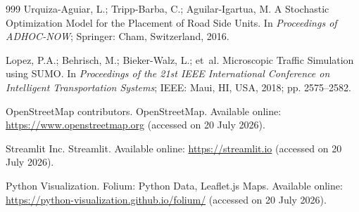 \documentclass[engproc,proceedingpaper,submit,oneauthor]{Definitions/mdpi}
\begin{document}



\begin{thebibliography}{999}
Urquiza-Aguiar, L.; Tripp-Barba, C.; Aguilar-Igartua, M. A Stochastic Optimization
Model for the Placement of Road Side Units. In {\em Proceedings of ADHOC-NOW};
Springer: Cham, Switzerland, 2016.

Lopez, P.A.; Behrisch, M.; Bieker-Walz, L.; et~al. Microscopic Traffic Simulation
using SUMO. In {\em Proceedings of the 21st IEEE International Conference on
Intelligent Transportation Systems}; IEEE: Maui, HI, USA, 2018; pp. 2575--2582.

OpenStreetMap contributors. OpenStreetMap. Available online:
\url{https://www.openstreetmap.org} (accessed on 20 July 2026).

Streamlit Inc. Streamlit. Available online: \url{https://streamlit.io} (accessed on
20 July 2026).

Python Visualization. Folium: Python Data, Leaflet.js Maps. Available online:
\url{https://python-visualization.github.io/folium/} (accessed on 20 July 2026).
\end{thebibliography}

\PublishersNote{}
\end{document}
